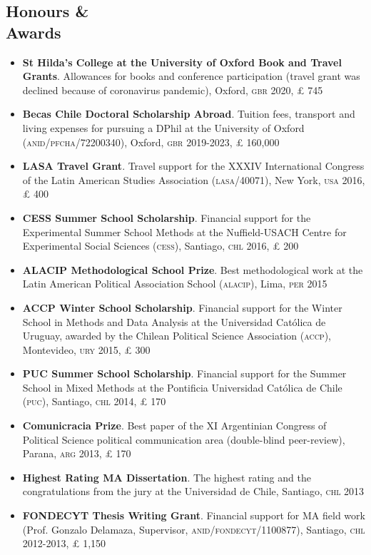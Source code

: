 \documentclass[letterpaper,margin]{res}
\begin{document}
\begin{resume}
\section{\footnotesize Honours \& \\ Awards} 

\begin{itemize}
\item{\small {\bfseries St Hilda's College at the University of Oxford Book and Travel Grants}. Allowances for books and conference participation (travel grant was declined because of coronavirus pandemic), Oxford, {\scshape gbr} 2020, {\pounds} 745}
\item{\small {\bfseries Becas Chile Doctoral Scholarship Abroad}. Tuition fees, transport and living expenses for pursuing a DPhil at the University of Oxford ({\scshape anid/pfcha}/72200340), Oxford, {\scshape gbr} 2019-2023, {\pounds} 160,000}
\item{\small {\bfseries LASA Travel Grant}. Travel support for the XXXIV International Congress of the Latin American Studies Association ({\scshape lasa}/40071), New York, {\scshape usa} 2016, {\pounds} 400}
\item{\small {\bfseries CESS Summer School Scholarship}. Financial support for the Experimental Summer School Methods at the Nuffield-USACH Centre for Experimental Social Sciences ({\scshape cess}), Santiago, {\scshape chl} 2016, {\pounds} 200}
\item {\small {\bfseries ALACIP Methodological School Prize}. Best methodological work at the Latin American Political Association School ({\scshape alacip}), Lima, {\scshape per} 2015}
\item{\small {\bfseries ACCP Winter School Scholarship}. Financial support for the Winter School in Methods and Data Analysis at the Universidad Cat\'olica de Uruguay, awarded by the Chilean Political Science Association ({\scshape accp}), Montevideo, {\scshape ury} 2015, {\pounds} 300}
\item{\small {\bfseries PUC Summer School Scholarship}. Financial support for the Summer School in Mixed Methods at the Pontificia Universidad Cat\'olica de Chile ({\scshape puc}), Santiago, {\scshape chl} 2014, {\pounds} 170}
\item{\small {\bfseries Comunicracia Prize}. Best paper of the XI Argentinian Congress of Political Science political communication area (double-blind peer-review), Parana, {\scshape arg} 2013, {\pounds} 170}
\item{\small {\bfseries Highest Rating MA Dissertation}. The highest rating and the congratulations from the jury at the Universidad de Chile, Santiago, {\scshape chl} 2013}
\item{\small {\bfseries FONDECYT Thesis Writing Grant}. Financial support for MA field work (Prof. Gonzalo Delamaza, Supervisor, {\scshape anid/fondecyt}/1100877), Santiago, {\scshape chl} 2012-2013, {\pounds} 1,150} %
\end{itemize}


\end{resume}
\end{document}
